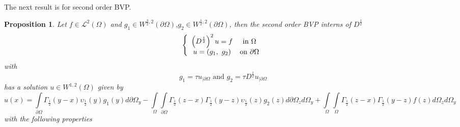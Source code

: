 \documentclass{amsart}%
\theoremstyle{plain}
\newtheorem{proposition}{Proposition}
\numberwithin{equation}{section}
\begin{document}
The next result is for second order BVP.

\begin{proposition}
Let $f\in%
\mathcal{L}%
^{2}\left(  \Omega\right)  $ and $g_{1}\in W^{\frac{3}{2},2}\left(
\partial\Omega\right)  $,$g_{2}\in W^{\frac{1}{2},2}\left(  \partial
\Omega\right)  $, then the second order BVP interns of $D^{\frac{1}{2}}$
\begin{equation}
\left\{
\begin{array}
[c]{cc}%
\left(  D^{\frac{1}{2}}\right)  ^{2}u=f & \text{in }\Omega\\
u=\left(  g_{1},\text{ }g_{2}\right)  & \text{on }\partial\Omega
\end{array}
\right. \label{secondbvp}%
\end{equation}
with
\[
g_{1}=\tau u_{\mid\partial\Omega}\text{ \ and \ }g_{2}=\tau D^{\frac{1}{2}%
}u_{\mid\partial\Omega}%
\]
has a solution $u\in W^{1,2}\left(  \Omega\right)  $ given by%
\[
u\left(  x\right)  =%
{\displaystyle\int\limits_{\partial\Omega}}
\Gamma_{\frac{1}{2}}\left(  y-x\right)  \upsilon_{\frac{1}{2}}\left(
y\right)  g_{1}\left(  y\right)  d\partial\Omega_{y}-%
{\displaystyle\int\limits_{\Omega}}
{\displaystyle\int\limits_{\partial\Omega}}
\Gamma_{\frac{1}{2}}\left(  z-x\right)  \Gamma_{\frac{1}{2}}\left(
y-z\right)  \upsilon_{\frac{1}{2}}\left(  z\right)  g_{2}\left(  z\right)
d\partial\Omega_{z}d\Omega_{y}+%
{\displaystyle\int\limits_{\Omega}}
{\displaystyle\int\limits_{\Omega}}
\Gamma_{\frac{1}{2}}\left(  z-x\right)  \Gamma_{\frac{1}{2}}\left(
y-z\right)  f\left(  z\right)  d\Omega_{z}d\Omega_{y}%
\]
with the following properties


\end{proposition}
\end{document}
